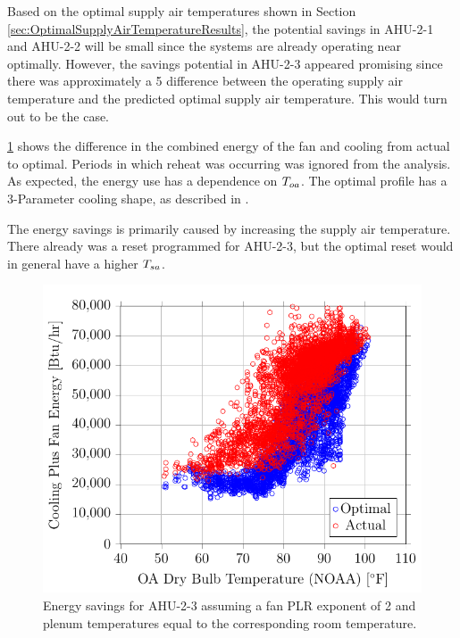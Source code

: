 Based on the optimal supply air temperatures shown in Section
\ref{sec:OptimalSupplyAirTemperatureResults}, the potential savings in
AHU-2-1 and AHU-2-2 will be small since the systems are already
operating near optimally. However, the savings potential in AHU-2-3
appeared promising since there was approximately a \SI{5}{\degreeF}
difference between the operating supply air temperature and the
predicted optimal supply air temperature. This would turn out to be the
case.

\figref{}
\ref{fig:2017-01-24-1607-VariableTotalPowervsOADryBulbTemperatureNOAA}
shows the difference in the combined energy of the fan and cooling from
actual to optimal. Periods in which reheat was occurring was ignored
from the analysis. As expected, the energy use has a dependence on
\(T_{oa}\). The optimal profile has a 3-Parameter cooling shape, as
described in \cite{AshraeGuideline2002}. 

The energy savings is primarily caused by increasing the supply air
temperature. There already was a reset programmed for AHU-2-3, but the
optimal reset would in general have a higher \(T_{sa}\). 


\begin{figure}
\centering
\includegraphics[]{Plots/2017-01-24-1607-VariableTotalPowervsOADryBulbTemperatureNOAA.pdf}
\caption{Energy savings for AHU-2-3 assuming a fan PLR exponent of 2 and plenum temperatures equal to the corresponding room temperature.}
\label{fig:2017-01-24-1607-VariableTotalPowervsOADryBulbTemperatureNOAA}
\end{figure}

